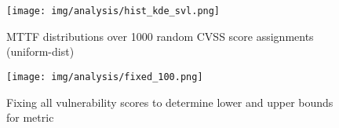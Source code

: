 \begin{figure}
        \texttt{[image: img/analysis/hist\_kde\_svl.png]} 
        \caption{MTTF distributions over 1000 random CVSS score assignments (uniform-dist)\cite{Dacier_1994}} 
        \label{fig:mttf_score_distributions}
\end{figure}

\begin{figure}
        \texttt{[image: img/analysis/fixed\_100.png]} 
        \caption{Fixing all vulnerability scores to determine lower and upper bounds for metric}     \label{fig:score_map_stepping}
\end{figure}




